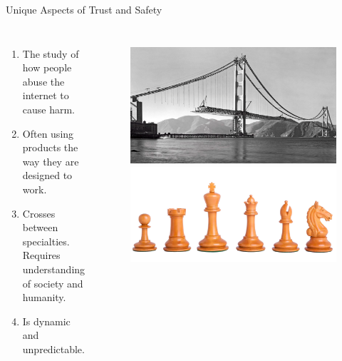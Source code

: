 \documentclass[nobackground,dvipsnames,table]{beamer}
\begin{document}
\begin{frame}{Unique Aspects of Trust and Safety}
    \begin{columns}
            \begin{enumerate}
                \item The study of how people abuse the internet to cause harm.
                \item Often using products the way they are designed to work.
                \item Crosses between specialties. Requires understanding of society and humanity.
                \item Is dynamic and unpredictable. 
            \end{enumerate}
            \begin{figure}
                \centering
                \includegraphics[width=\textwidth]{bridge-construction}
                \includegraphics[width=\textwidth]{chess}
            \end{figure}
        \end{columns}
\end{frame}
\end{document}
